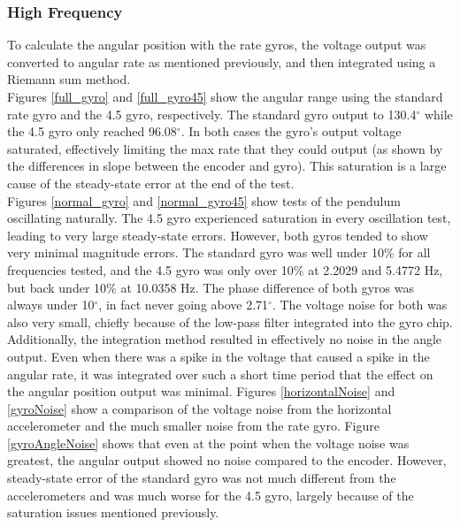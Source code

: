 \documentclass{article}
\theoremstyle{plain}
\theoremstyle{definition}
\theoremstyle{remark}
\begin{document}
\subsubsection{High Frequency}

To calculate the angular position with the rate gyros, the voltage output was converted to angular rate as mentioned previously, and then integrated using a Riemann sum method. \\

Figures \ref{full_gyro} and \ref{full_gyro45} show the angular range using the standard rate gyro and the 4.5 gyro, respectively. The standard gyro output to 130.4$^{\circ}$ while the 4.5 gyro only reached 96.08$^{\circ}$. In both cases the gyro's output voltage saturated, effectively limiting the max rate that they could output (as shown by the differences in slope between the encoder and gyro). This saturation is a large cause of the steady-state error at the end of the test.\\

Figures \ref{normal_gyro} and \ref{normal_gyro45} show tests of the pendulum oscillating naturally. The 4.5 gyro experienced saturation in every oscillation test, leading to very large steady-state errors. However, both gyros tended to show very minimal magnitude errors. The standard gyro was well under 10\% for all frequencies tested, and the 4.5 gyro was only over 10\% at 2.2029 and 5.4772 Hz, but back under 10\% at 10.0358 Hz. The phase difference of both gyros was always under 10$^{\circ}$, in fact never going above 2.71$^{\circ}$. The voltage noise for both was also very small, chiefly because of the low-pass filter integrated into the gyro chip. Additionally, the integration method resulted in effectively no noise in the angle output. Even when there was a spike in the voltage that caused a spike in the angular rate, it was integrated over such a short time period that the effect on the angular position output was minimal. Figures \ref{horizontalNoise} and \ref{gyroNoise} show a comparison of the voltage noise from the horizontal accelerometer and the much smaller noise from the rate gyro. Figure \ref{gyroAngleNoise} shows that even at the point when the voltage noise was greatest, the angular output showed no noise compared to the encoder. However,  steady-state error of the standard gyro was not much different from the accelerometers and was much worse for the 4.5 gyro, largely because of the saturation issues mentioned previously.\\ 
\end{document}
